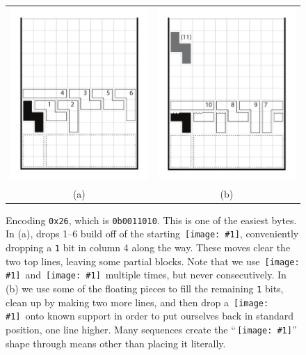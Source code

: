 \documentclass[twocolumn]{article}
\newcommand\tetrispiece[1]{\,\texttt{[image: \#1]}\hspace{0.1em}}
\newcommand\zhoriz{\tetrispiece{z_horiz}}
\newcommand\svert{\tetrispiece{s_vert}}
\newcommand\ldown{\tetrispiece{l_down}}
\begin{document}
\begin{figure}
  \begin{tabular}{cc}
  \includegraphics[width=0.4 \linewidth]{encode26a} &
  \includegraphics[width=0.4 \linewidth]{encode26b} \\
  (a) & (b)
  \end{tabular}
  \caption{ Encoding {\tt 0x26}, which is {\tt 0b0011010}. This is one
    of the easiest bytes. In (a), drops 1--6 build off of the starting
    \svert, conveniently dropping a {\tt 1} bit in column 4 along the
    way. These moves clear the two top lines, leaving some partial
    blocks. Note that we use \zhoriz\ and \ldown\ multiple times, but
    never consecutively. In (b) we use some of the floating pieces to
    fill the remaining {\tt 1} bits, clean up by making two more
    lines, and then drop a \svert\ onto known support in order to put
    ourselves back in standard position, one line higher. Many
    sequences create the ``\svert'' shape through means other than
    placing it literally. } \label{fig:encode26}
\end{figure}
\end{document}
